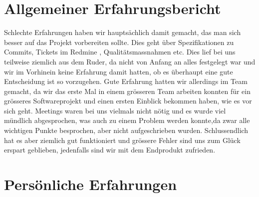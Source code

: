 \documentclass[11pt]{scrartcl}
\begin{document}
\section{Allgemeiner Erfahrungsbericht}
Schlechte Erfahrungen haben wir hauptsächlich damit gemacht, 
das man sich besser auf das Projekt vorbereiten sollte.
Dies geht über Spezifikationen zu Commits, 
Tickets im Redmine , Qualitätsmassnahmen etc.
Dies lief bei uns teilweise ziemlich aus dem Ruder, 
da nicht von Anfang an alles
 festgelegt war und wir im Vorhinein keine Erfahrung damit hatten, ob es 
 überhaupt eine gute Entscheidung ist so vorzugehen.
 Gute Erfahrung hatten wir allerdings im Team gemacht, da wir das erste Mal
 in einem grösseren Team arbeiten konnten für ein grösseres Softwareprojekt
 und einen ersten Einblick bekommen haben, wie es vor sich geht.
 Meetings waren bei uns vielmals nicht nötig und es wurde viel
 mündlich abgesprochen, was auch zu einem Problem werden konnte,da
 zwar alle wichtigen Punkte besprochen, aber nicht aufgeschrieben wurden.
 Schlussendlich hat es aber ziemlich gut funktioniert und grössere Fehler
 sind uns zum Glück erspart geblieben, jedenfalls sind wir mit dem Endprodukt
  zufrieden.
  \newpage
\section{Persönliche Erfahrungen}
\end{document}
